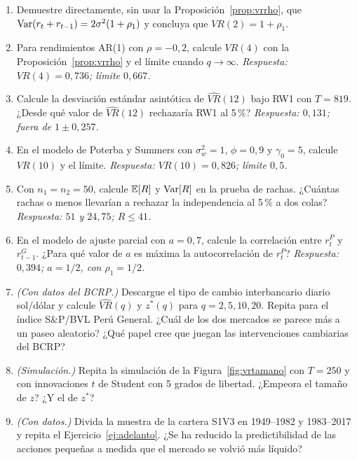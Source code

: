 \begin{enumerate}[label=\textbf{\thechapter.\arabic*},leftmargin=*,itemsep=6pt]
  \item Demuestre directamente, sin usar la Proposición~\ref{prop:vrrho}, que
  $\operatorname{Var}(r_t+r_{t-1})=2\sigma^2(1+\rho_1)$ y concluya que $VR(2)=1+\rho_1$.

  \item Para rendimientos AR(1) con $\rho=-0{,}2$, calcule $VR(4)$ con la Proposición~\ref{prop:vrrho} y el
  límite cuando $q\to\infty$. \textit{Respuesta: $VR(4)=0{,}736$; límite $0{,}667$.}

  \item Calcule la desviación estándar asintótica de $\widehat{VR}(12)$ bajo RW1 con $T=819$. ¿Desde qué valor
  de $\widehat{VR}(12)$ rechazaría RW1 al 5\,\%? \textit{Respuesta: $0{,}131$; fuera de $1\pm0{,}257$.}

  \item En el modelo de Poterba y Summers con $\sigma_w^2=1$, $\phi=0{,}9$ y $\gamma_0=5$, calcule $VR(10)$ y el
  límite. \textit{Respuesta: $VR(10)=0{,}826$; límite $0{,}5$.}

  \item Con $n_1=n_2=50$, calcule $\mathbb{E}[R]$ y $\operatorname{Var}[R]$ en la prueba de rachas. ¿Cuántas rachas o menos llevarían a
  rechazar la independencia al 5\,\% a dos colas? \textit{Respuesta: $51$ y $24{,}75$; $R\le41$.}

  \item En el modelo de ajuste parcial con $a=0{,}7$, calcule la correlación entre $r^P_t$ y $r^G_{t-1}$.
  ¿Para qué valor de $a$ es máxima la autocorrelación de $r^P_t$? \textit{Respuesta: $0{,}394$; $a=1/2$, con
  $\rho_1=1/2$.}

  \item \emph{(Con datos del BCRP.)} Descargue el tipo de cambio interbancario diario sol/dólar y calcule
  $\widehat{VR}(q)$ y $z^*(q)$ para $q=2,5,10,20$. Repita para el índice S\&P/BVL Perú General. ¿Cuál de los dos
  mercados se parece más a un paseo aleatorio? ¿Qué papel cree que juegan las intervenciones cambiarias del BCRP?

  \item \emph{(Simulación.)} Repita la simulación de la Figura~\ref{fig:vrtamano} con $T=250$ y con
  innovaciones $t$ de Student con 5 grados de libertad. ¿Empeora el tamaño de $z$? ¿Y el de $z^*$?

  \item \emph{(Con datos.)} Divida la muestra de la cartera S1V3 en 1949--1982 y 1983--2017 y repita el
  Ejercicio~\ref{ej:adelanto}. ¿Se ha reducido la predictibilidad de las acciones pequeñas a medida que el
  mercado se volvió más líquido?
\end{enumerate}

